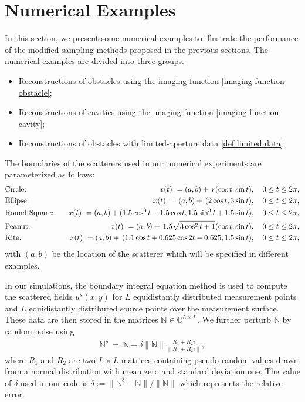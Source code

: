\documentclass[final]{siamltex}
\newcommand{\C}{{\mathbb C}}
\newcommand{\be}{\begin{eqnarray}}
\newcommand{\ben}{\begin{eqnarray*}}
\newcommand{\en}{\end{eqnarray}}
\newcommand{\enn}{\end{eqnarray*}}
\begin{document}
\section{Numerical Examples} \label{section numerical examples}

In this section, we present some numerical examples to illustrate the performance of the modified sampling methods proposed in the previous sections.
The numerical examples are divided into three groups.
\begin{itemize}
  \item Reconstructions of obstacles using the imaging function \eqref{imaging function obstacle};
  \item Reconstructions of cavities using the imaging function  \eqref{imaging function cavity};
  \item Reconstructions of obstacles with limited-aperture data \eqref{def limited data}.
\end{itemize}
The boundaries of the scatterers used in our numerical experiments are parameterized as follows:
\be
\label{circle}&\mbox{\rm Circle:}&\quad x(t)\ =(a,b)+\, r(\cos t, \sin t),\quad 0\leq t\leq2\pi,\\
\label{ellipse}&\mbox{\rm Ellipse:}&\quad x(t)\ =(a,b)+\, (2\cos t, 3\sin t),\quad 0\leq t\leq2\pi,\\
\label{roundsquare}&\mbox{\rm Round Square:}&\quad x(t)\ =(a,b)+(1.5\cos^{3}t +1.5\cos t, 1.5\sin^{3}t +1.5\sin t),\quad 0\leq t\leq2\pi,\\
\label{peanut}&\mbox{\rm Peanut:}&\quad x(t)\ =(a,b)+\, 1.5\sqrt{3\cos^2 t+1}(\cos t, \sin t),\quad 0\leq t\leq2\pi,\\
\label{kite}&\mbox{\rm Kite:}&\quad x(t)\ =(a,b)+\, (1.1\cos t+0.625\cos 2t-0.625, 1.5\sin t),\quad 0\leq t\leq2\pi,
\en
with $(a,b)$ be the location of the scatterer which will be specified in different examples.

In our simulations, the boundary integral equation method is used to compute the
scattered fields $u^{s}(x;y)$ for $L$ equidistantly distributed measurement points  and $L$ equidistantly distributed source points over the measurement surface. These data are then stored in the matrices $\mathbb{N} \in \C^{L \times L}$.
We further perturb $\mathbb{N}$ by random noise using
\ben
\mathbb{N}^{\delta}\ =\ \mathbb{N} +\delta\|\mathbb{N}\|\frac{R_1+R_2 i}{\|R_1+R_2 i\|},
\enn
where $R_1$ and $R_2$ are two $L \times L$ matrices containing pseudo-random values
drawn from a normal distribution with mean zero and standard deviation one. The
value of $\delta$ used in our code is $\delta:=\|\mathbb{N}^{\delta} -\mathbb{N}\|/\|\mathbb{N}\|$ which represents the relative error.
\end{document}
